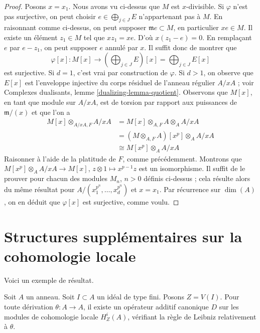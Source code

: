 \begin{proof}
\medskip\noindent
Posons $x = x_1$. Nous avons vu ci-dessus que $M$ est $x$-divisible. Si $\varphi$ n'est pas surjective, on peut choisir $e \in \bigoplus_{j \in J} E$ n'appartenant pas à $M$. En raisonnant comme ci-dessus, on peut supposer $\mathfrak m e \subset M$, en particulier $x e \in M$. Il existe un élément $z_1 \in M$ tel que $x z_1 = x e$. D'où $x(z_1 - e) = 0$. En remplaçant $e$ par $e - z_1$, on peut supposer $e$ annulé par $x$. Il suffit donc de montrer que
$$
\varphi[x] :
M[x]
\longrightarrow
\left(\bigoplus\nolimits_{j \in J} E\right)[x] =
\bigoplus\nolimits_{j \in J} E[x]
$$
est surjective. Si $d = 1$, c'est vrai par construction de $\varphi$. Si $d > 1$, on observe que $E[x]$ est l'enveloppe injective du corps résiduel de l'anneau régulier $A/xA$ ; voir Complexes dualisants, lemme \ref{dualizing-lemma-quotient}. Observons que $M[x]$, en tant que module sur $A/xA$, est de torsion par rapport aux puissances de $\mathfrak m/(x)$ et que l'on a
\begin{align*}
M[x] \otimes_{A/xA, F} A/xA
& = M[x] \otimes_{A, F} A \otimes_A A/xA \\
& = (M \otimes_{A, F} A)[x^p] \otimes_A A/xA \\
& \cong M[x^p] \otimes_A A/xA
\end{align*}
Raisonner à l'aide de la platitude de $F$, comme précédemment. Montrons que $M[x^p] \otimes_A A/xA \to M[x]$, $z \otimes 1 \mapsto x^{p - 1}z$ est un isomorphisme. Il suffit de le prouver pour chacun des modules $M_n$, $n > 0$ définis ci-dessus ; cela résulte alors du même résultat pour $A/(x_1^{p^n}, \ldots, x_d^{p^n})$ et $x = x_1$. Par récurrence sur $\dim(A)$, on en déduit que $\varphi[x]$ est surjective, comme voulu.
\end{proof}





\section{Structures supplémentaires sur la cohomologie locale}
\label{section-additional}

\noindent
Voici un exemple de résultat.

\begin{lemma}
\label{lemma-derivation}
Soit $A$ un anneau. Soit $I \subset A$ un idéal de type fini. Posons $Z = V(I)$. Pour toute dérivation $\theta : A \to A$, il existe un opérateur additif canonique $D$ sur les modules de cohomologie locale $H^i_Z(A)$, vérifiant la règle de Leibniz relativement à $\theta$.
\end{lemma}

